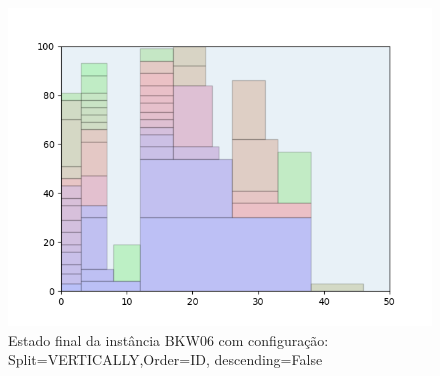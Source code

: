 \begin{figure}[H]
    \centering
    \caption[]{Estado final da instância BKW06 com configuração: Split=VERTICALLY,Order=ID, descending=False}
    \label{fig:bkw06-vertically-id-false}
    \includegraphics[scale=0.5]{output/figures/bkw/bkw06/vertically/id/false/00}
\end{figure}